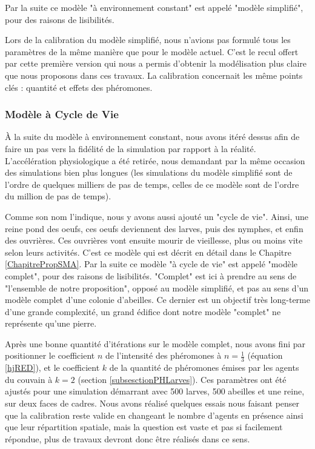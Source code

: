 			Par la suite ce modèle "à environnement constant" est appelé "modèle simplifié", pour des raisons de lisibilités.
			
			Lors de la calibration du modèle simplifié, nous n'avions pas formulé tous les paramètres de la même manière que pour le modèle actuel. C'est le recul offert par cette première version qui nous a permis d'obtenir la modélisation plus claire que nous proposons dans ces travaux. La calibration concernait les même points clés : quantité et effets des phéromones.
			
			
			\subsubsection{Modèle à Cycle de Vie}
			À la suite du modèle à environnement constant, nous avons itéré dessus afin de faire un pas vers la fidélité de la simulation par rapport à la réalité. L'accélération physiologique a été retirée, nous demandant par la même occasion des simulations bien plus longues (les simulations du modèle simplifié sont de l'ordre de quelques milliers de pas de temps, celles de ce modèle sont de l'ordre du million de pas de temps).
			
			Comme son nom l'indique, nous y avons aussi ajouté un "cycle de vie". Ainsi, une reine pond des oeufs, ces oeufs deviennent des larves, puis des nymphes, et enfin des ouvrières. Ces ouvrières vont ensuite mourir de vieillesse, plus ou moins vite selon leurs activités. C'est ce modèle qui est décrit en détail dans le Chapitre \ref{ChapitrePropSMA}.
			Par la suite ce modèle "à cycle de vie" est appelé "modèle complet", pour des raisons de lisibilités. "Complet" est ici à prendre au sens de "l'ensemble de notre proposition", opposé au modèle simplifié, et pas au sens d'un modèle complet d'une colonie d'abeilles. Ce dernier est un objectif très long-terme d'une grande complexité, un grand édifice dont notre modèle "complet" ne représente qu'une pierre.
			
			Après une bonne quantité d'itérations sur le modèle complet, nous avons fini par positionner le coefficient $n$ de l'intensité des phéromones à $n = \frac{1}{3}$ (équation \ref{hjRED}), et le coefficient $k$ de la quantité de phéromones émises par les agents du couvain à $k=2$ (section \ref{subsesctionPHLarves}). Ces paramètres ont été ajustés pour une simulation démarrant avec 500 larves, 500 abeilles et une reine, sur deux faces de cadres. Nous avons réalisé quelques essais nous faisant penser que la calibration reste valide en changeant le nombre d'agents en présence ainsi que leur répartition spatiale, mais la question est vaste et pas si facilement répondue, plus de travaux devront donc être réalisés dans ce sens.
		
